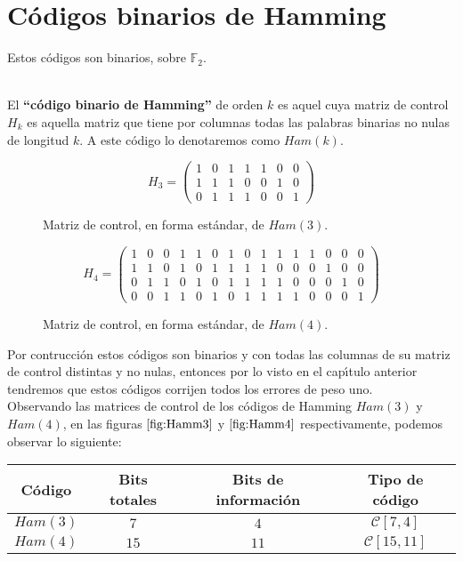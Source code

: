%
%

\section{C\'odigos binarios de Hamming}

Estos c\'odigos son binarios, sobre $\mathbb{F}_2$.
\begin{definicion}
\ \\
El \textbf{``c\'odigo binario de Hamming''} de orden $k$ es aquel cuya matriz
de control $H_k$ es aquella matriz que tiene por columnas todas las palabras
binarias no nulas de longitud $k$. A este c\'odigo lo denotaremos como $Ham(k)$.
\end{definicion}
\begin{figure}[!h]
\begin{displaymath}
H_3=\left( \begin{array}{ccccccc}
1&0&1&1&1&0&0\\
1&1&1&0&0&1&0\\
0&1&1&1&0&0&1
\end{array} \right)
\end{displaymath}
\caption{Matriz de control, en forma est\'andar, de $Ham(3)$.}\label{fig:Hamm3}
\end{figure}
%
\begin{figure}[!h]
\begin{displaymath}
H_4=\left( \begin{array}{ccccccccccccccc}
1&0&0&1&1&0&1&0&1&1&1&1&0&0&0\\
1&1&0&1&0&1&1&1&1&0&0&0&1&0&0\\
0&1&1&0&1&0&1&1&1&1&0&0&0&1&0\\
0&0&1&1&0&1&0&1&1&1&1&0&0&0&1
\end{array} \right)
\end{displaymath}
\caption{Matriz de control, en forma est\'andar, de $Ham(4)$.}\label{fig:Hamm4}
\end{figure}
Por contrucci\'on estos c\'odigos son binarios y con todas las columnas de su
matriz de control distintas y no nulas, entonces por lo visto en el
cap\'{\i}tulo anterior tendremos que estos c\'odigos corrijen todos los errores
de peso uno.\\

Observando las matrices de control de los c\'odigos de Hamming $Ham(3)$ y
$Ham(4)$, en las figuras $\ref{fig:Hamm3}$ y $\ref{fig:Hamm4}$ respectivamente,
podemos observar lo siguiente:\\
\begin{center}
\begin{tabular}{|c|c|c|c|}
\hline
C\'odigo & Bits totales & Bits de informaci\'on & Tipo de c\'odigo \\
\hline
$Ham(3)$ & $7$  & $4$  & $\mathcal{C}[7,4]$ \\
\hline
$Ham(4)$ & $15$ & $11$ & $\mathcal{C}[15,11]$ \\
\hline
\end{tabular}
\end{center}

